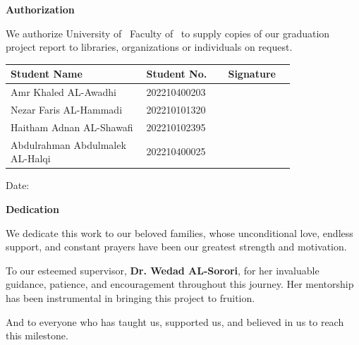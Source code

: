 \documentclass[12pt,a4paper]{report} %
\begin{document}
\clearpage
\begin{mdframed}[
  linewidth=0.8pt,
  roundcorner=2pt,
  skipabove=10pt,
  skipbelow=14pt,
  innerleftmargin=14pt,
  innerrightmargin=14pt,
  innertopmargin=25pt,
  innerbottommargin=25pt
]
  \begin{center}
    {\bfseries\large Authorization}
  \end{center}

  {\normalsize
  We authorize University of \dotfill\ Faculty of \dotfill\ to supply copies of our
  graduation project report to libraries, organizations or individuals on request.
  }

  \vspace{8pt}

\renewcommand{\arraystretch}{1.3} %
\begin{tabular}{|C{0.40\linewidth}|C{0.23\linewidth}|C{0.17\linewidth}|}
  \hline
  \textbf{Student Name} & \textbf{Student No.} & \textbf{Signature} \\
  \hline
  Amr Khaled AL-Awadhi & 202210400203 & \\ \hline
  Nezar Faris AL-Hammadi & 202210101320 & \\ \hline
  Haitham Adnan AL-Shawafi & 202210102395 & \\ \hline
  Abdulrahman Abdulmalek AL-Halqi & 202210400025 & \\ \hline
\end{tabular}

  \vspace{8pt}

  {\normalsize Date: \dotfill}
\end{mdframed}

\begin{mdframed}[
  linewidth=0.8pt,
  roundcorner=2pt,
  skipabove=10pt,
  skipbelow=14pt,
  innerleftmargin=14pt,
  innerrightmargin=14pt,
  innertopmargin=25pt,
  innerbottommargin=25pt
]
  \begin{center}
    {\bfseries\large Dedication}
  \end{center}

  {\normalsize
  We dedicate this work to our beloved families, whose unconditional love, endless support, and constant prayers have been our greatest strength and motivation.
  
  \vspace{10pt}
  
  To our esteemed supervisor, \textbf{Dr. Wedad AL-Sorori}, for her invaluable guidance, patience, and encouragement throughout this journey. Her mentorship has been instrumental in bringing this project to fruition.
  
  \vspace{10pt}
  
  And to everyone who has taught us, supported us, and believed in us to reach this milestone.
  }
\end{mdframed}
\end{document}
